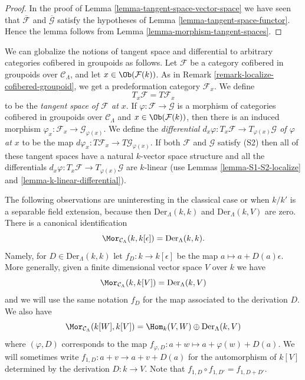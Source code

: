 \begin{proof}
In the proof of
Lemma \ref{lemma-tangent-space-vector-space}
we have seen that $\overline{\mathcal{F}}$ and $\overline{\mathcal{G}}$
satisfy the hypotheses of
Lemma \ref{lemma-tangent-space-functor}.
Hence the lemma follows from
Lemma \ref{lemma-morphism-tangent-spaces}.
\end{proof}

\begin{remark}
\label{remark-tangent-space-cofibered-groupoid}
We can globalize the notions of tangent space and differential to arbitrary
categories cofibered in groupoids as follows. Let $\mathcal{F}$ be a category
cofibered in groupoids over $\mathcal{C}_\Lambda$, and let
$x \in \Ob(\mathcal{F}(k))$. As in
Remark \ref{remark-localize-cofibered-groupoid},
we get a predeformation category $\mathcal{F}_x$. We define
$$
T_x\mathcal{F} = T\mathcal{F}_x
$$
to be the {\it tangent space of $\mathcal{F}$ at $x$}. If
$\varphi : \mathcal{F} \to \mathcal{G}$ is a morphism of categories cofibered
in groupoids over $\mathcal{C}_\Lambda$ and $x \in \Ob(\mathcal{F}(k))$,
then there is an induced morphism
$\varphi_x: \mathcal{F}_x \to \mathcal{G}_{\varphi(x)}$. We define the
{\it differential
$d_x \varphi : T_x \mathcal{F} \to T_{\varphi(x)} \mathcal{G}$
of $\varphi$ at $x$} to be the map
$d \varphi_x: T \mathcal{F}_x \to T \mathcal{G}_{\varphi(x)}$.
If both $\mathcal{F}$ and $\mathcal{G}$ satisfy (S2) then
all of these tangent spaces have a natural $k$-vector space structure
and all the differentials
$d_x \varphi : T_x \mathcal{F} \to T_{\varphi(x)} \mathcal{G}$
are $k$-linear (use
Lemmas \ref{lemma-S1-S2-localize} and \ref{lemma-k-linear-differential}).
\end{remark}

\noindent
The following observations are uninteresting in the classical case or when
$k/k'$ is a separable field extension, because then
$\text{Der}_\Lambda(k, k)$ and $\text{Der}_\Lambda(k, V)$ are zero.
There is a canonical identification
$$
\Mor_{\mathcal{C}_\Lambda}(k, k[\epsilon]) =
\text{Der}_\Lambda(k, k).
$$
Namely, for $D \in \text{Der}_\Lambda(k, k)$ let $f_D : k \to k[\epsilon]$
be the map $a \mapsto a + D(a)\epsilon$. More generally, given a finite
dimensional vector space $V$ over $k$ we have
$$
\Mor_{\mathcal{C}_\Lambda}(k, k[V]) =
\text{Der}_\Lambda(k, V)
$$
and we will use the same notation $f_D$ for the map associated to the
derivation $D$. We also have
$$
\Mor_{\mathcal{C}_\Lambda}(k[W], k[V]) =
\Hom_k(V, W) \oplus \text{Der}_\Lambda(k, V)
$$
where $(\varphi, D)$ corresponds to the map
$f_{\varphi, D} : a + w \mapsto a + \varphi(w) + D(a)$. We will sometimes write
$f_{1, D} : a + v \to a + v + D(a)$ for the automorphism
of $k[V]$ determined by the derivation $D : k \to V$. Note that
$f_{1, D} \circ f_{1, D'} = f_{1, D + D'}$.

